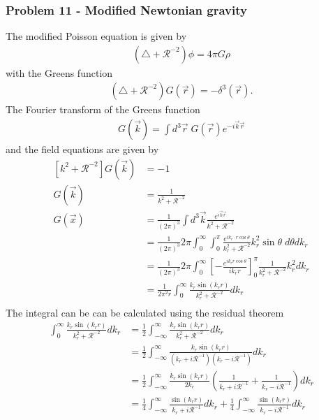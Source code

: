 \documentclass[10pt,a4paper]{article}
\theoremstyle{definition}
\begin{document}
\subsubsection{Problem 11 - Modified Newtonian gravity}
The modified Poisson equation is given by
\begin{align}
    \left(\triangle+\mathcal{R}^{-2}\right)\phi=4\pi G\rho
\end{align}
with the Greens function
\begin{align}
    \left(\triangle+\mathcal{R}^{-2}\right)G(\vec{r})=-\delta^3(\vec{r}).
\end{align}
The Fourier transform of the Greens function
\begin{align}
    G(\vec{k}) = \int d^3\vec{r}\;G(\vec{r})e^{-i\vec{k}\vec{r}}
\end{align}
and the field equations are given by
\begin{align}
    \left[k^2+\mathcal{R}^{-2}\right]G(\vec{k})&=-1\\
    G(\vec{k})&=\frac{1}{k^2+\mathcal{R}^{-2}}\\
    G(\vec{x})&=\frac{1}{(2\pi)^3}\int d^3\vec{k} \frac{e^{i\vec{k}\vec{r}}}{k^2+\mathcal{R}^{-2}}\\
    &=\frac{1}{(2\pi)^3}2\pi\int_0^\infty \int_{0}^{\pi} \frac{e^{ik_r\cdot r\cos\theta}}{k_r^2+\mathcal{R}^{-2}}k_r^2\sin\theta\;d\theta dk_r\\
    &=\frac{1}{(2\pi)^3}2\pi\int_0^\infty \left[-\frac{e^{ik_r r \cos\theta}}{ik_r r}\right]_0^\pi \frac{1}{k_r^2+\mathcal{R}^{-2}}k_r^2 dk_r\\
    &=\frac{1}{2\pi^2r}\int_0^\infty  \frac{k_r \sin(k_r r)}{k_r^2+\mathcal{R}^{-2}} dk_r\\
\end{align}
The integral can be can be calculated using the residual theorem
\begin{align}
        \int_0^\infty \frac{k_r \sin(k_r r)}{k_r^2+\mathcal{R}^{-2}} dk_r&=\frac{1}{2}\int_{-\infty}^\infty \frac{k_r \sin(k_r r)}{k_r^2+\mathcal{R}^{-2}} dk_r\\
        &=\frac{1}{2}\int_{-\infty}^\infty \frac{k_r \sin(k_r r)}{(k_r+i\mathcal{R}^{-1})(k_r-i\mathcal{R}^{-1})} dk_r\\
        &=\frac{1}{2}\int_{-\infty}^\infty \frac{k_r \sin(k_r r)}{2k_r}\left(\frac{1}{k_r+i\mathcal{R}^{-1}}+\frac{1}{k_r-i\mathcal{R}^{-1}}\right) dk_r\\
        &=\frac{1}{4}\int_{-\infty}^\infty \frac{\sin(k_r r)}{k_r+i\mathcal{R}^{-1}}dk_r + \frac{1}{4}\int_{-\infty}^\infty \frac{\sin(k_r r)}{k_r-i\mathcal{R}^{-1}}dk_r
\end{align}
\end{document}
